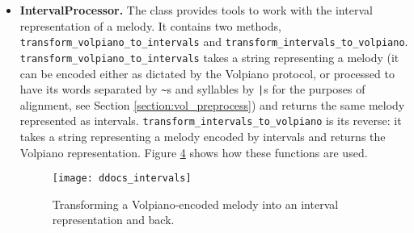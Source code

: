 \begin{itemize}
\begin{figure}[!h]
\centering
\texttt{[image: ddocs\_text-to-syllables]}
\caption{Example of dividing Latin text into syllables using \emph{ChantProcessor}.}
\label{fig:syl_text}
\end{figure}

\begin{figure}[!h]
\centering
\texttt{[image: ddocs\_volpiano\_to\_syllables]}
\caption{Example of dividing a melody encoded as Volpiano into syllables using \emph{ChantProcessor}.}
\label{fig:syl_volpiano}
\end{figure}

The method \verb|get_stressed_syllables| takes a Latin string as input and returns a list whose elements represent words, where word is a list of 0s and 1s,
a 0 representing an unstresed syllable and a 1 representing a stressed one. To calculate the stressed syllables, we use the module \verb|cltk|. However, 
its stress recognition is not completely accurate, therefore this method may also return incorrect results. However, no other functionality depends on
the results of the stress calculation. The function is shown in use in Figure \ref{fig:syl_stress}.

\begin{figure}[!h]
\centering
\texttt{[image: ddocs\_syllables-stressed]}
\caption{Example of finding the stressed syllables of a Latin text using \emph{ChantProcessor}.}
\label{fig:syl_stress}
\end{figure}

\item\textbf{IntervalProcessor.} The class provides tools to work with the interval representation of a melody. It contains two methods, \verb|transform_volpiano_to|\verb|_intervals|
and \verb|transform_intervals_to_volpiano|. \verb|transform|\verb|_volpiano|\verb|_to|\verb|_intervals| takes a string representing a melody (it can be encoded either as dictated by the Volpiano protocol, or processed
to have its words separated by \verb|~|s and syllables by \verb=|=s for the purposes of alignment, see Section \ref{section:vol_preprocess}) and returns the same melody represented as intervals.
\verb|transform|\verb|_intervals|\verb|_to|\verb|_volpiano| is its reverse: it takes a string representing a melody encoded by intervals and returns the Volpiano representation.
Figure \ref{fig:vol_intervals} shows how these functions are used.

\begin{figure}[!h]
\centering
\texttt{[image: ddocs\_intervals]}
\caption{Transforming a Volpiano-encoded melody into an interval representation and back.}
\label{fig:vol_intervals}
\end{figure}


\end{itemize}
